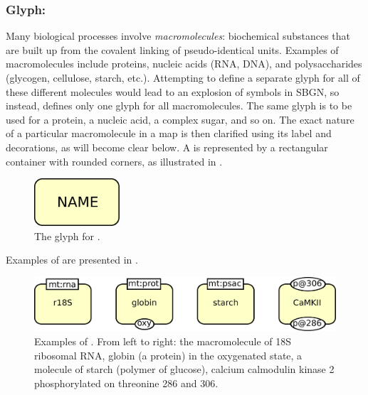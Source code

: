 \subsubsection{Glyph: }
\label{sec:macromolecule}

Many biological processes involve \emph{macromolecules}: biochemical substances that are built up from the covalent linking of pseudo-identical units.  Examples of macromolecules include proteins, nucleic acids (RNA, DNA), and polysaccharides (glycogen, cellulose, starch, etc.).  Attempting to define a separate glyph for all of these different molecules would lead to an explosion of symbols in SBGN, so instead, \SBGNPDLone defines only one glyph for all macromolecules.  The same glyph is to be used for a protein, a nucleic acid, a complex sugar, and so on.  The exact nature of a particular macromolecule in a map is then clarified using its label and decorations, as will become clear below.  A  is represented by a rectangular container with rounded corners, as illustrated in . 

\begin{figure}[H]
  \centering
  \includegraphics[width = 1.25in]{le_images/macromolecule-plain}
  \caption{The \PD glyph for .}
  \label{fig:macromolecule}
\end{figure}

Examples of  are presented in .

\begin{figure}[H]
  \centering
  \includegraphics[scale = 0.5]{le_images/macromolecule-examples}
  \caption{Examples of . From left to right: the macromolecule of 18S ribosomal RNA, globin (a protein) in the oxygenated state, a molecule of starch (polymer of glucose), calcium calmodulin kinase 2 phosphorylated on threonine 286 and 306.}
  \label{fig:macromolecule-examples}
\end{figure}


